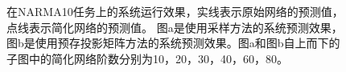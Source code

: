 \begin{figure}
	\centering

	\caption{在NARMA10任务上的系统运行效果，实线表示原始网络的预测值，点线表示简化网络的预测值。
		图a是使用采样方法的系统预测效果，图b是使用预存投影矩阵方法的系统预测效果。图a和图b自上而下的子图中的简化网络阶数分别为10，20，30，40，60，80。}
	\label{fig:narma10}
\end{figure}



